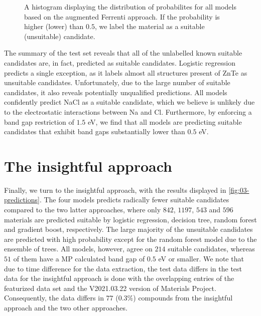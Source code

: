 \begin{figure}[ht!]
    \centering
    
    \vspace*{-130mm}
    \caption{A histogram displaying the distribution of probabilites for all models based on the augmented Ferrenti approach. If the probability is higher (lower) than $0.5$, we label the material as a suitable (unsuitable) candidate.}
    \label{fig:histogram-augmented-ferrenti}
\end{figure}

The summary of the test set reveals that all of the unlabelled known suitable candidates are, in fact, predicted as suitable candidates. Logistic regression predicts a single exception, as it labels almost all structures present of ZnTe as unsuitable candidates. Unfortunately, due to the large number of suitable candidates, it also reveals potentially unqualified predictions. All models confidently predict NaCl as a suitable candidate, which we believe is unlikely due to the electrostatic interactions between Na and Cl. Furthermore, by enforcing a band gap restriction of $1.5$ eV, we find that all models are predicting suitable candidates that exhibit band gaps substantially lower than $0.5$ eV.



\section{The insightful approach}

Finally, we turn to the insightful approach, with the results displayed in \autoref{fig:03-predictions}. The four models predicts radically fewer suitable candidates compared to the two latter approaches, where only $842$, $1197$, $543$ and $596$ materials are predicted suitable by logistic regression, decision tree, random forest and gradient boost, respectively. The large majority of the unsuitable candidates are predicted with high probability except for the random forest model due to the ensemble of trees. All models, however, agree on $214$ suitable candidates, whereas $51$ of them have a MP calculated band gap of $0.5$ eV or smaller. We note that due to time difference for the data extraction, the test data differs in
the test data for the insightful approach is done with the overlapping entries of the featurized data set and the V2021.03.22 version of Materials Project. Consequently, the data differs in $77$ ($0.3\%$) compounds from the insightful approach and the two other approaches.

